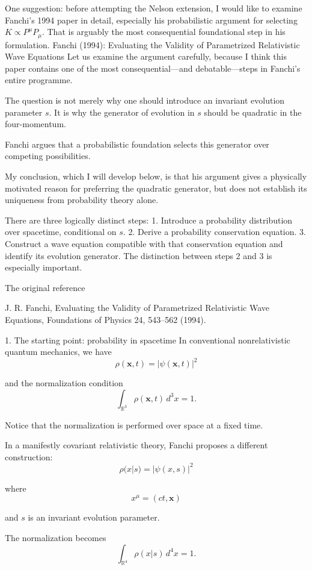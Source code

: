 One suggestion: before attempting the Nelson extension, I would like to examine Fanchi's 1994 paper in detail, especially his probabilistic argument for selecting \(K\propto P^\mu P_\mu\). That is arguably the most consequential foundational step in his formulation.
Fanchi (1994): Evaluating the Validity of Parametrized Relativistic Wave Equations
Let us examine the argument carefully, because I think this paper contains one of the most consequential—and debatable—steps in Fanchi's entire programme.

The question is not merely why one should introduce an invariant evolution parameter \(s\). It is why the generator of evolution in \(s\) should be quadratic in the four-momentum.

Fanchi argues that a probabilistic foundation selects this generator over competing possibilities.

My conclusion, which I will develop below, is that his argument gives a physically motivated reason for preferring the quadratic generator, but does not establish its uniqueness from probability theory alone.

There are three logically distinct steps:
1. Introduce a probability distribution over spacetime, conditional on \(s\).
2. Derive a probability conservation equation.
3. Construct a wave equation compatible with that conservation equation and identify its evolution generator.
The distinction between steps 2 and 3 is especially important.

The original reference

J. R. Fanchi, Evaluating the Validity of Parametrized Relativistic Wave Equations, Foundations of Physics 24, 543–562 (1994).

1. The starting point: probability in spacetime
In conventional nonrelativistic quantum mechanics, we have
\[
\rho(\mathbf x,t)=|\psi(\mathbf x,t)|^2
\]

and the normalization condition
\[
\int_{\mathbb R^3}\rho(\mathbf x,t)\,d^3x=1.
\]

Notice that the normalization is performed over space at a fixed time.

In a manifestly covariant relativistic theory, Fanchi proposes a different construction:
\[
\boxed{\rho(x|s)=|\psi(x,s)|^2}
\]

where
\[
x^\mu=(ct,\mathbf x)
\]

and \(s\) is an invariant evolution parameter.

The normalization becomes
\[
\boxed{
\int_{\mathbb R^4}\rho(x|s)\,d^4x=1.
}
\tag{1}
\]


